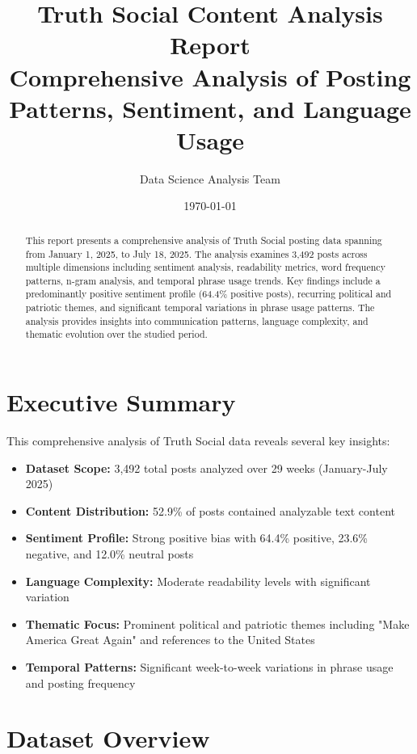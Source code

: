 \documentclass[12pt,a4paper]{article}
\title{\textbf{Truth Social Content Analysis Report}\\
\large Comprehensive Analysis of Posting Patterns, Sentiment, and Language Usage}
\author{Data Science Analysis Team}
\date{\today}
\begin{document}
\maketitle

\begin{abstract}
This report presents a comprehensive analysis of Truth Social posting data spanning from January 1, 2025, to July 18, 2025. The analysis examines 3,492 posts across multiple dimensions including sentiment analysis, readability metrics, word frequency patterns, n-gram analysis, and temporal phrase usage trends. Key findings include a predominantly positive sentiment profile (64.4\% positive posts), recurring political and patriotic themes, and significant temporal variations in phrase usage patterns. The analysis provides insights into communication patterns, language complexity, and thematic evolution over the studied period.
\end{abstract}

\tableofcontents
\newpage

\section{Executive Summary}

This comprehensive analysis of Truth Social data reveals several key insights:

\begin{itemize}[leftmargin=*]
    \item \textbf{Dataset Scope:} 3,492 total posts analyzed over 29 weeks (January-July 2025)
    \item \textbf{Content Distribution:} 52.9\% of posts contained analyzable text content
    \item \textbf{Sentiment Profile:} Strong positive bias with 64.4\% positive, 23.6\% negative, and 12.0\% neutral posts
    \item \textbf{Language Complexity:} Moderate readability levels with significant variation
    \item \textbf{Thematic Focus:} Prominent political and patriotic themes including "Make America Great Again" and references to the United States
    \item \textbf{Temporal Patterns:} Significant week-to-week variations in phrase usage and posting frequency
\end{itemize}

\section{Dataset Overview}
\end{document}
